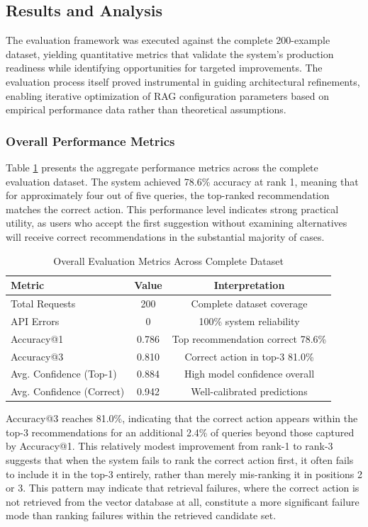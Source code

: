 \subsection{Results and Analysis}

The evaluation framework was executed against the complete 200-example dataset, yielding quantitative metrics that validate the system's production readiness while identifying opportunities for targeted improvements. The evaluation process itself proved instrumental in guiding architectural refinements, enabling iterative optimization of RAG configuration parameters based on empirical performance data rather than theoretical assumptions.

\subsubsection{Overall Performance Metrics}

Table \ref{tab:overall_metrics} presents the aggregate performance metrics across the complete evaluation dataset. The system achieved 78.6\% accuracy at rank 1, meaning that for approximately four out of five queries, the top-ranked recommendation matches the correct action. This performance level indicates strong practical utility, as users who accept the first suggestion without examining alternatives will receive correct recommendations in the substantial majority of cases.

\begin{table}[htbp]
\centering
\begin{tabular}{lcc}
\toprule
\textbf{Metric} & \textbf{Value} & \textbf{Interpretation} \\
\midrule
Total Requests & 200 & Complete dataset coverage \\
API Errors & 0 & 100\% system reliability \\
Accuracy@1 & 0.786 & Top recommendation correct 78.6\% \\
Accuracy@3 & 0.810 & Correct action in top-3 81.0\% \\
Avg. Confidence (Top-1) & 0.884 & High model confidence overall \\
Avg. Confidence (Correct) & 0.942 & Well-calibrated predictions \\
\bottomrule
\end{tabular}
\caption{Overall Evaluation Metrics Across Complete Dataset}
\label{tab:overall_metrics}
\end{table}

Accuracy@3 reaches 81.0\%, indicating that the correct action appears within the top-3 recommendations for an additional 2.4\% of queries beyond those captured by Accuracy@1. This relatively modest improvement from rank-1 to rank-3 suggests that when the system fails to rank the correct action first, it often fails to include it in the top-3 entirely, rather than merely mis-ranking it in positions 2 or 3. This pattern may indicate that retrieval failures, where the correct action is not retrieved from the vector database at all, constitute a more significant failure mode than ranking failures within the retrieved candidate set.

